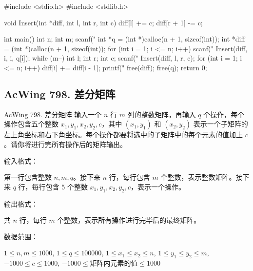\begin{mycpptwocol}[差分]
    #include <stdio.h>
    #include <stdlib.h>

    void Insert(int *diff, int l, int r, int c) {
        diff[l] += c;
        diff[r + 1] -= c;
    }

    int main() {
        int n;
        int m;
        scanf("%
        int *q = (int *)calloc(n + 1, sizeof(int));
        int *diff = (int *)calloc(n + 1, sizeof(int));
        for (int i = 1; i <= n; i++) {
            scanf("%
            Insert(diff, i, i, q[i]);
        }
        while (m--) {
            int l;
            int r;
            int c;
            scanf("%
            Insert(diff, l, r, c);
        }
        for (int i = 1; i <= n; i++) {
            diff[i] += diff[i - 1];
            printf("%
        }
        free(diff);
        free(q);
        return 0;
    }
\end{mycpptwocol}

\subsection{AcWing 798. 差分矩阵}
\begin{titledbox}{AcWing 798. 差分矩阵}
    输入一个 $n$ 行 $m$ 列的整数矩阵，再输入 $q$ 个操作，每个操作包含五个整数 $x_1, y_1, x_2, y_2, c$，其中 $(x_1, y_1)$ 和 $(x_2, y_2)$ 表示一个子矩阵的左上角坐标和右下角坐标。每个操作都要将选中的子矩阵中的每个元素的值加上 $c$。请你将进行完所有操作后的矩阵输出。

    输入格式：

    第一行包含整数 $n,m,q$。接下来 $n$ 行，每行包含 $m$ 个整数，表示整数矩阵。接下来 $q$ 行，每行包含 $5$ 个整数 $x_1, y_1, x_2, y_2, c$，表示一个操作。

    输出格式：

    共 $n$ 行，每行 $m$ 个整数，表示所有操作进行完毕后的最终矩阵。

    数据范围：

    $1 \le n,m \le 1000$, $1 \le q \le 100000$, $1 \le x_1 \le x_2 \le n$, $1 \le y_1 \le y_2 \le m$, $-1000 \le c \le 1000$, $-1000 \le \text{矩阵内元素的值} \le 1000$

    \begin{inputblock}
         \\
         \\
         \\
         \\
         \\
         \\
    \end{inputblock}
    \begin{outputblock}
         \\
    \end{outputblock}
\end{titledbox}

